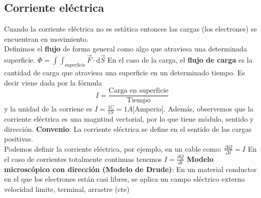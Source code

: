 \subsection{Corriente eléctrica}
Cuando la corriente eléctrica no es estática entonces las cargas (los electrones) se encuentran en movimiento.\\ 
Definimos el \textbf{flujo} de forma general como algo que atraviesa una determinada superficie. 
$\Phi = \int\int_{\text{superficie}}\vec{F}\cdot \mathrm{d}\vec{S}$
En el caso de la carga, el \textbf{flujo de carga} es la cantidad de carga que atraviesa una superficie en un determinado tiempo. Es decir viene dada por la fórmula $$I = \frac{\text{Carga en superficie}}{\text{Tiempo}}$$
y la unidad de la corriene es ${I}=\frac{1C}{1S} = 1A$[Amperio].
Además, observemos que la corriente eléctrica es una magntiud vectorial, por lo que tiene módulo, sentido y dirección.
\textbf{Convenio}: La corriente eléctrica se define en el sentido de las cargas positivas.\\
Podemos definir la corriente eléctrica, por ejemplo, en un cable como: 
$\frac{\Delta Q}{\Delta t} = I$ En el caso de corrientes totalmente continuas tenemos $I = \frac{dQ}{dt}$
\textbf{Modelo microscópico con dirección (Modelo de Drude)}: En un material conductor en el que los electrones están casi libres, se aplica un campo eléctrico externo 
velocidad limite, terminal, arrastre (cte)
    